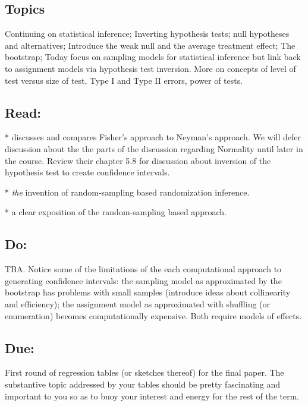 \documentclass[10pt]{article}
\begin{document}

\subsection{Topics} Continuing on statistical inference; Inverting
hypothesis tests; null hypotheses and alternatives; Introduce the weak
null and the average treatment effect; The bootstrap; Today focus on
sampling models for statistical inference but link back to assignment
models via hypothesis test inversion. More on concepts of
level of test versus size of test, Type I and Type II errors, power of tests.

\subsection{Read:}
\citealp[Chap 14]{kaplan2009ism} 

\citealp[Chap 7]{gonick1993cgs}

\citealp[Chap 21]{fox2008applied}

*\citealp[Chap 6]{imbens2009causal} discusses and compares Fisher's
approach to Neyman's approach. We will defer discussion about the the parts of the
discussion regarding Normality until later in the course. Review their
chapter 5.8 for discussion about inversion of the hypothesis test to
create confidence intervals.

*\citealp{neyman:1923,rubin1990apt} \emph{the} invention of
random-sampling based randomization inference.

*\citealp[Chap 2.7]{lohr:1999} a clear exposition of the
random-sampling based approach.

\subsection{Do:} TBA. Notice some of the limitations
of the each computational approach to generating confidence intervals:
the sampling model as approximated by the bootstrap has problems with
small samples (introduce ideas about collinearity and efficiency); the
assignment model as approximated with shuffling (or enumeration)
becomes computationally expensive. Both require models of effects.

\subsection{Due:} First round of regression tables (or sketches
thereof) for the final paper. The substantive topic addressed by your
tables should be pretty fascinating and important to you so as to buoy
your interest and energy for the rest of the term.
\end{document}
